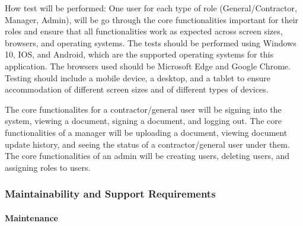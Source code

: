 \documentclass[12pt, titlepage]{article}
\begin{document}
\begin{enumerate}
    How test will be performed: One user for each type of role
    (General/Contractor, Manager, Admin), will be go through the core
    functionalities important for their roles and ensure that all
    functionalities work as expected across screen sizes, browsers,
    and operating systems. The tests should be performed using
    Windows 10, IOS, and Android, which are the supported operating
    systems for this application. The browsers used should be
    Microsoft Edge and Google Chrome. Testing should include a mobile
    device, a desktop, and a tablet to ensure accommodation of
    different screen sizes and of different types of devices.

    The core functionalites for a contractor/general user will be
    signing into the system, viewing a document, signing a document,
    and logging out. The core functionalities of a manager will be
    uploading a document, viewing document update history, and seeing
    the status of a contractor/general user under them. The core
    functionalities of an admin will be creating users, deleting
    users, and assigning roles to users.

\end{enumerate}

\subsubsection{Maintainability and Support Requirements}

\paragraph{Maintenance}
\end{document}
